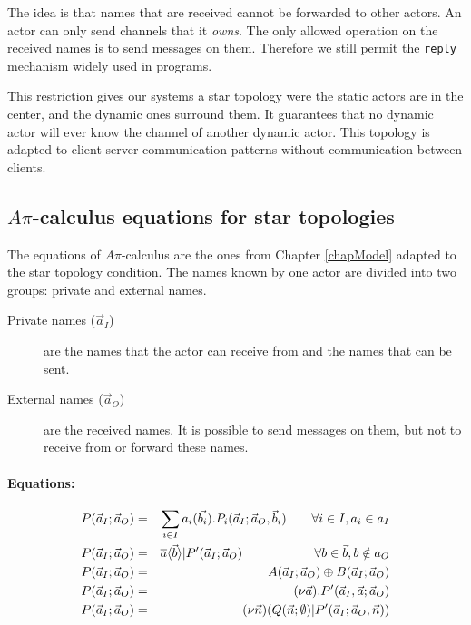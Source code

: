 \documentclass[a4paper]{report}
\numberwithin{algorithm}{chapter}
\begin{document}
The idea is that names that are received cannot be forwarded to other actors.
An actor can only send channels that it \emph{owns}.
The only allowed operation on the received names is to send messages on them.
Therefore we still permit the \texttt{reply} mechanism widely used in \scala{} programs.

This restriction gives our systems a star topology were the static actors are in the center, and the dynamic ones surround them. 
It guarantees that no dynamic actor will ever know the channel of another dynamic actor.
This topology is adapted to client-server communication patterns without communication between clients.

\subsection{$A\pi$-calculus equations for star topologies}
The equations of $A\pi$-calculus are the ones from Chapter \ref{chapModel} adapted to the star topology condition.
The names known by one actor are divided into two groups: private and external names.
\begin{description}
\item[Private names ($\vec a_I$)] are the names that the actor can receive from and the names that can be sent.
\item[External names ($\vec a_O$)] are the received names. It is possible to send messages on them, but not to receive from or forward these names.
\end{description}

\paragraph{Equations:}

\begin{eqnarray}
\label{dyn_receive}     P(\vec a_I; \vec a_O) & = & \sum_{i \in I} a_i (\vec{b_i}).P_i(\vec a_I ;\vec a_O, \vec b_i) \hspace{7mm} \forall i \in I, a_i \in a_I \\
\label{dyn_send}        P(\vec a_I; \vec a_O) & = & \overline{a}\langle \vec{b} \rangle | P^\prime(\vec a_I ;\vec a_O) \hspace{20mm} \forall b \in \vec b, b \notin a_O \\
\label{dyn_choice}      P(\vec a_I; \vec a_O) & = & A(\vec a_I; \vec a_O) \oplus B(\vec a_I; \vec a_O) \\
\label{dyn_channel}     P(\vec a_I; \vec a_O) & = & (\nu \vec a).P^\prime(\vec a_I, \vec a; \vec a_O) \\
\label{dyn_creation}    P(\vec a_I; \vec a_O) & = & (\nu \vec n)(Q(\vec n;\emptyset) | P^\prime(\vec a_I ; \vec a_O , \vec n)) 
\end{eqnarray}
\end{document}
